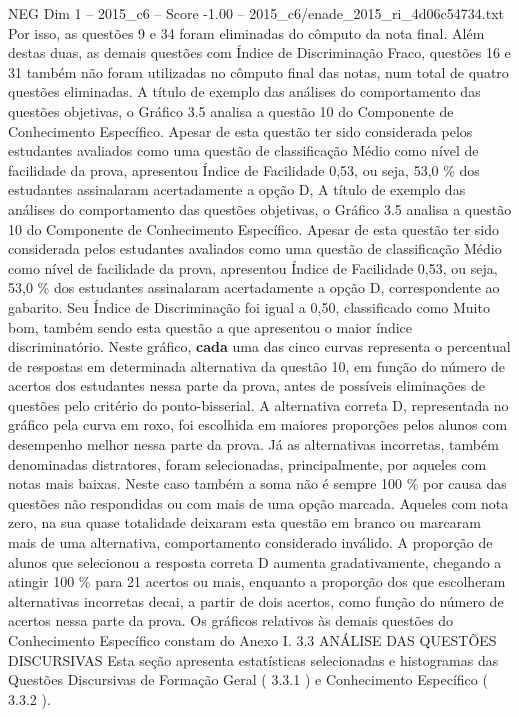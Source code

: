 \begin{textsample}{NEG Dim 1 – 2015\_c6 – Score -1.00 – 2015\_c6/enade\_2015\_ri\_4d06c54734.txt}
Por isso, as questões 9 e 34 foram eliminadas do cômputo da nota final.
Além destas duas, as demais questões com Índice de Discriminação Fraco, questões 16 e 31 também não foram utilizadas no cômputo final das notas, num total de quatro questões eliminadas.
A título de exemplo das análises do comportamento das questões objetivas, o Gráfico 3.5 analisa a questão 10 do Componente de Conhecimento Específico.
Apesar de esta questão ter sido considerada pelos estudantes avaliados como uma questão de classificação Médio como nível de facilidade da prova, apresentou Índice de Facilidade 0,53, ou seja, 53,0 \% dos estudantes assinalaram acertadamente a opção D, A título de exemplo das análises do comportamento das questões objetivas, o Gráfico 3.5 analisa a questão 10 do Componente de Conhecimento Específico.
Apesar de esta questão ter sido considerada pelos estudantes avaliados como uma questão de classificação Médio como nível de facilidade da prova, apresentou Índice de Facilidade 0,53, ou seja, 53,0 \% dos estudantes assinalaram acertadamente a opção D, correspondente ao gabarito.
Seu Índice de Discriminação foi igual a 0,50, classificado como Muito bom, também sendo esta questão a que apresentou o maior índice discriminatório.
Neste gráfico, \textbf{cada} uma das cinco curvas representa o percentual de respostas em determinada alternativa da questão 10, em função do número de acertos dos estudantes nessa parte da prova, antes de possíveis eliminações de questões pelo critério do ponto-bisserial.
A alternativa correta D, representada no gráfico pela curva em roxo, foi escolhida em maiores proporções pelos alunos com desempenho melhor nessa parte da prova.
Já as alternativas incorretas, também denominadas distratores, foram selecionadas, principalmente, por aqueles com notas mais baixas.
Neste caso também a soma não é sempre 100 \% por causa das questões não respondidas ou com mais de uma opção marcada.
Aqueles com nota zero, na sua quase totalidade deixaram esta questão em branco ou marcaram mais de uma alternativa, comportamento considerado inválido.
A proporção de alunos que selecionou a resposta correta D aumenta gradativamente, chegando a atingir 100 \% para 21 acertos ou mais, enquanto a proporção dos que escolheram alternativas incorretas decai, a partir de dois acertos, como função do número de acertos nessa parte da prova.
Os gráficos relativos às demais questões do Conhecimento Específico constam do Anexo I. 3.3 ANÁLISE DAS QUESTÕES DISCURSIVAS Esta seção apresenta estatísticas selecionadas e histogramas das Questões Discursivas de Formação Geral ( 3.3.1 ) e Conhecimento Específico ( 3.3.2 ).

\end{textsample}
